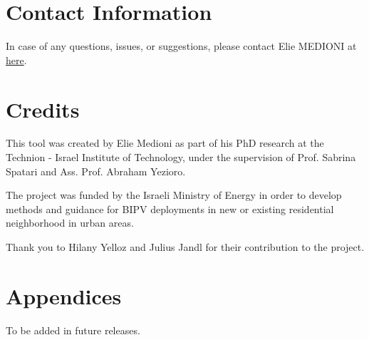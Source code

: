 \documentclass[a4paper,12pt]{article} %
\begin{document}
\section{Contact Information}
\label{sec:Contact Information}
In case of any questions, issues, or suggestions, please contact Elie MEDIONI at \href{mailto:elie-medioni@campus.technion.ac.il}{here}.

\section{Credits}
\label{sec:Credits}

This tool was created by Elie Medioni as part of his PhD
research at the Technion - Israel Institute of Technology, under the
supervision of Prof. Sabrina Spatari and Ass. Prof. Abraham Yezioro.

The project was funded by the Israeli Ministry of Energy in order to develop methods and guidance for BIPV deployments
in new or existing residential neighborhood in urban areas.

Thank you to Hilany Yelloz and Julius Jandl for their contribution to the project.


\section{Appendices}
\label{sec:Appendices}
To be added in future releases.
\end{document}
